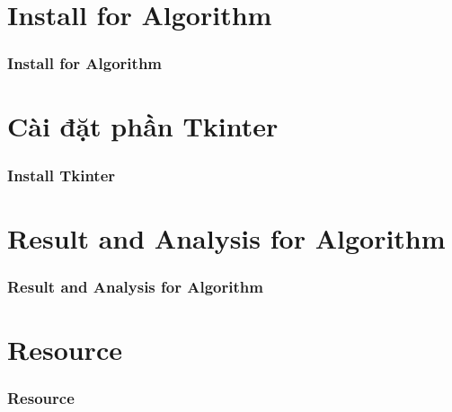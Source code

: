 \documentclass[10.5pt]{beamer}
\begin{document}
\section{Install for Algorithm}
\begin{frame}
	\frametitle{\fontsize{11.5pt}{12.5pt}\selectfont Install for Algorithm}
\end{frame}

\section{Cài đặt phần Tkinter}
\begin{frame}
	\frametitle{\fontsize{11.5pt}{12.5pt}\selectfont Install Tkinter}
\end{frame}

\section{Result and Analysis for Algorithm}
\begin{frame}
	\frametitle{\fontsize{11.5pt}{12.5pt}\selectfont  Result and Analysis for Algorithm}
\end{frame}

\section{Resource}
\begin{frame}
	\frametitle{\fontsize{11.5pt}{12.5pt}\selectfont Resource}
\end{frame}
\end{document}

